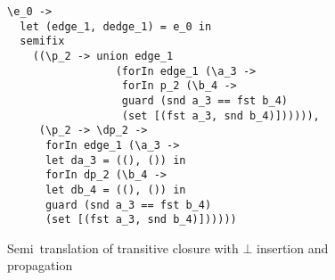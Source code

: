\begin{figure}[p]
  \footnotesize
  \begin{lstlisting}
\e_0 ->
  let (edge_1, dedge_1) = e_0 in
  semifix
    ((\p_2 -> union edge_1
                 (forIn edge_1 (\a_3 ->
                  forIn p_2 (\b_4 ->
                  guard (snd a_3 == fst b_4)
                  (set [(fst a_3, snd b_4)]))))),
     (\p_2 -> \dp_2 ->
      forIn edge_1 (\a_3 ->
      let da_3 = ((), ()) in
      forIn dp_2 (\b_4 ->
      let db_4 = ((), ()) in
      guard (snd a_3 == fst b_4)
      (set [(fst a_3, snd b_4)])))))
  \end{lstlisting}
  \caption{Semi\naive\ translation of transitive closure with $\bot$ insertion and propagation}
  \label{figure-trans-seminaive}
\end{figure}
